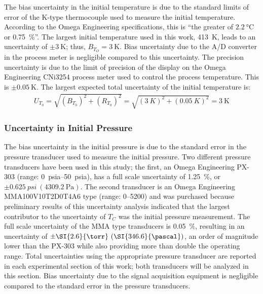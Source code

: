 \documentclass[../main.tex]{subfiles}
\begin{document}
The bias uncertainty in the initial temperature is due to the standard
limits of error of the K-type thermocouple used to measure the
initial temperature. According to the Omega Engineering
specifications, this is ``the greater
of $\SI{2.2}{\degreeCelsius}$ or \SI{0.75}{\percent}''. The largest initial temperature
used in this work, \SI{413}{\kelvin}, leads to an uncertainty of
$\pm \SI{3}{\kelvin}$; thus, $B_{T_O}=\SI{3}{\kelvin}$. Bias uncertainty
due to the A/D converter in the process meter is negligible compared
to this uncertainty.
The precision uncertainty is due to the limit of precision of
the display on the Omega Engineering CNi3254 process meter used
to control the process temperature. This is $\pm\SI{0.05}{\kelvin}$.
The largest expected total uncertainty of the initial temperature is:
%
\begin{align}
U_{T_0} = \sqrt{\left(B_{T_0}\right)^2 + \left(R_{T_0}\right)^2} = \sqrt{\left(\SI{3}{K}\right)^2 + \left(\SI{0.05}{K}\right)^2} = \SI{3}{\kelvin}
\end{align}

\subsubsection{Uncertainty in Initial Pressure}
\label{sec:unc-p0}

The bias uncertainty in the initial pressure is due to the
standard error in the pressure transducer used to measure
the initial pressure. Two different pressure transducers have
been used in this study; the first, an Omega Engineering PX-303
(range: \SIrange{0}{50}{psia}), has a full scale uncertainty of \SI{1.25}{\percent}, or
$\pm \SI{0.625}{psi} \ (\SI{4309.2}{\pascal})$. The second transducer is an
Omega Engineering MMA100V10T2D0T4A6 type (range: \SIrange{0}{5200}{\torr}) and was
purchased because preliminary results of this uncertainty analysis
indicated that the largest contributor to the uncertainty of $T_C$ was
the initial pressure measurement. The full scale uncertainty of the MMA
type transducers is \SI{0.05}{\percent}, resulting in an uncertainty of
$\pm \SI{2.6}{\torr} \ (\SI{346.6}{\pascal})$, an order of magnitude lower than
the PX-303 while also providing more than double the operating range. Total
uncertainties using the appropriate pressure transducer are reported in
each experimental section of this work; both transducers will be analyzed
in this section. Bias uncertainty due to the signal acquisition equipment
is negligible compared to the standard error in the pressure transducers.
\end{document}
